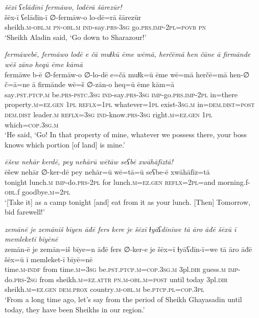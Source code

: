 \ea \label{PM.16}
\textit{šēxī ʕelādīnī fermāwo, lodērā šārezūr!} \\ 
\gll šēx-ī ʕelādīn-ī ∅-fermāw-o lo-dē=rā šārezūr \\ 
 sheikh\textsc{.m}\textsc{-obl}\textsc{.m} \textsc{pn}\textsc{-obl}\textsc{.m} \textsc{ind-}say\textsc{.prs}\textsc{-3sg} go\textsc{.prs}.\textsc{imp-}\textsc{2pl}\textsc{=\textsc{povb}} \textsc{pn} \\ 
\glt `Sheikh Aladin said, ‘Go down to Sharazour!'
\z 
 
\ea \label{PM.20}
\textit{fermāwebē, fermāwo lodē e čā muɫkū ēme wēmā, herčēmā hen čāne ā firmānde wēš zāno heqū ēme kāmā} \\ 
\gll fermāwe b-ē ∅-fermāw-o ∅-lo-dē e=čā muɫk=ū ēme wē=mā herčē=mā hen-∅ č=ā=ne ā firmānde wē=š ∅-zān-o heq=ū ēme kām=ā \\ 
 say\textsc{.pst}\textsc{.ptcp}\textsc{.m} be\textsc{.prs}\textsc{-pstc}\textsc{.3sg} \textsc{ind-}say\textsc{.prs}\textsc{-3sg} \textsc{imp-}go\textsc{.prs}.\textsc{imp-}\textsc{2pl} in=there property\textsc{.m}\textsc{\textsc{=ez.gen}} \textsc{1pl} \textsc{reflx}\textsc{=1pl} whatever\textsc{=1pl} exist\textsc{-3sg}\textsc{.m} in=\textsc{dem.dist}\textsc{=\textsc{post}} \textsc{dem.dist} leader\textsc{.m} \textsc{reflx}\textsc{=3sg} \textsc{ind-}know\textsc{.prs}\textsc{-3sg} right\textsc{.m}\textsc{\textsc{=ez.gen}} \textsc{1pl} which\textsc{=cop}\textsc{.3sg}\textsc{.m} \\ 
\glt `He said, ‘Go! In that property of mine, whatever we possess there, your boss knows which portion [of land] is mine.'
\z 
 
\ea \label{PM.21}
\textit{ēšew nehār kerdē, pey nehārū wētāw seʕbē xwāhāfīztā!} \\ 
\gll ēšew nehār ∅-ker-dē pey nehār=ū wē=tā=ū seʕbe-ē xwāhāfīz=tā \\ 
 tonight lunch\textsc{.m} \textsc{imp-}do\textsc{.prs}-\textsc{2pl} for lunch\textsc{.m}\textsc{\textsc{=ez.gen}} \textsc{reflx}=\textsc{2pl}=and morning.f\textsc{-obl}.f goodbye\textsc{.m}=\textsc{2pl} \\ 
\glt `[Take it] as a camp tonight [and] eat from it as your lunch. [Then] Tomorrow, bid farewell!'
\z 
 
\ea \label{DG.8}
\textit{zemānē je zemāniš bīyen āđē fers kere je šēxī ɫyāʕdīnīwe tā āro āđē šēxū ī memleketī bīyēnē} \\ 
\gll zemān-ē je zemān=iš bīye=n āđē fers ∅-ker-e je šēx=ī ɫyāʕdīn-ī=we tā āro āđē šēx=ū ī memleket-ī bīyē=nē \\ 
 time\textsc{.m}\textsc{-indf} from time\textsc{.m}\textsc{=3sg} be\textsc{.pst}\textsc{.ptcp}\textsc{.m}\textsc{=cop}\textsc{.3sg}\textsc{.m} 3pl\textsc{.dir} guess\textsc{.m} \textsc{imp-}do\textsc{.prs}-\textsc{2sg} from sheikh\textsc{.m}\textsc{=ez}.\textsc{attr} \textsc{pn}\textsc{.m}\textsc{-obl}\textsc{.m}\textsc{=\textsc{post}} until today 3pl\textsc{.dir} sheikh\textsc{.m}\textsc{=ez}\textsc{.gen} \textsc{dem.prox} country\textsc{.m}\textsc{-obl}\textsc{.m} be\textsc{.ptcp}\textsc{.pl}\textsc{=cop}\textsc{.3pl} \\ 
\glt `From a long time ago, let’s say from the period of Sheikh Ghayasadin until today, they have been Sheikhs in our region.'
\z 
 
